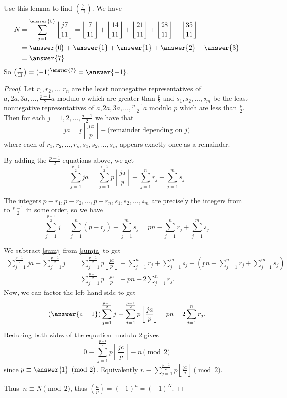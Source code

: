 \documentclass{ximera}
\theoremstyle{definition}
\begin{document}
\begin{question}
 Use this lemma to find $\left(\frac{7}{11}\right)$. We have
 \begin{align*}
 N&=\sum_{j=1}^{\answer{5}
 }
 \left\lfloor\frac{j7}{11}\right\rfloor= \left\lfloor\frac{7}{11}\right\rfloor+ \left\lfloor\frac{14}{11}\right\rfloor+\left\lfloor\frac{21}{11}\right\rfloor+ \left\lfloor\frac{28}{11}\right\rfloor+\left\lfloor\frac{35}{11}\right\rfloor\\
 &=\answer{0}
 +\answer{1}
 +\answer{1}
 +\answer{2}
 +\answer{3}
 \\&=
 \answer{7}
 \end{align*}
 So $\left(\frac{7}{11}\right)=(-1)^{\answer{7}
 }=\answer{-1}
 .$
\end{question}

\begin{proof}
 Let $r_1,r_2,\dots,r_n$ are the least nonnegative representatives of $a,2a,3a,\dots,\frac{p-1}{2}a$ modulo $p$ which are greater than $\frac{p}{2}$ and $s_1,s_2,\dots,s_m$ be the least nonnegative representatives of $a,2a,3a,\dots,\frac{p-1}{2}a$ modulo $p$ which are less than $\frac{p}{2}$.  Then for each $j=1,2, \dots, \frac{p-1}{2}$ we have that \[ja=p\left\lfloor\frac{ja}{p}\right\rfloor+\textrm{(remainder depending on $j$)}\]
 where each of $r_1,r_2, \dots, r_n,s_1,s_2,\dots,s_m$ appears exactly once as a remainder. 
 
By adding the $\frac{p-1}{2}$ equations above, we get
\begin{equation}\label{sumja}\sum_{j=1}^{\frac{p-1}{2} }ja=\sum_{j=1}^{\frac{p-1}{2}}p\left\lfloor\frac{ja}{p}\right\rfloor+\sum_{j=1}^n r_j+\sum_{j=1}^m s_j
\end{equation}

The integers $p-r_1,p-r_2,\dots,p-r_n,s_1,s_2,\dots,s_m$ are precisely the integers from $1$ to $\frac{p-1}{2}$ in some order, so we have 
\begin{equation}\label{sumj}
 \sum_{j=1}^{\frac{p-1}{2}} j=\sum_{j=1}^n (p-r_j)+\sum_{j=1}^m s_j=pn-\sum_{j=1}^n r_j+\sum_{j=1}^m s_j
\end{equation}

We subtract \eqref{sumj} from \eqref{sumja} to get 
\begin{align*}
 \sum_{j=1}^{\frac{p-1}{2} }ja- \sum_{j=1}^{\frac{p-1}{2}} j&=\sum_{j=1}^{\frac{p-1}{2}}p\left\lfloor\frac{ja}{p}\right\rfloor+\sum_{j=1}^n r_j+\sum_{j=1}^m s_j -\left( pn-\sum_{j=1}^n r_j+\sum_{j=1}^m s_j \right)\\
 &=\sum_{j=1}^{\frac{p-1}{2}}p\left\lfloor\frac{ja}{p}\right\rfloor -pn +2\sum_{j=1}^n r_j.
\end{align*}
Now, we can factor the left hand side to get 
\[(\answer{a-1}
)\sum_{j=1}^{\frac{p-1}{2}} j=\sum_{j=1}^{\frac{p-1}{2}}p\left\lfloor\frac{ja}{p}\right\rfloor -pn +2\sum_{j=1}^n r_j.\]
Reducing both sides of the equation modulo 2 gives
\[0\equiv \sum_{j=1}^{\frac{p-1}{2}}p\left\lfloor\frac{ja}{p}\right\rfloor -n \pmod 2\] since $p\equiv \answer{1}
\pmod 2$. Equivalently $n\equiv \sum_{j=1}^{\frac{p-1}{2}}p\left\lfloor\frac{ja}{p}\right\rfloor\pmod 2$.

Thus, $n\equiv N \pmod 2$, thus $\left(\frac{a}{p}\right)=(-1)^n=(-1)^N$.
\end{proof}
\end{document}
